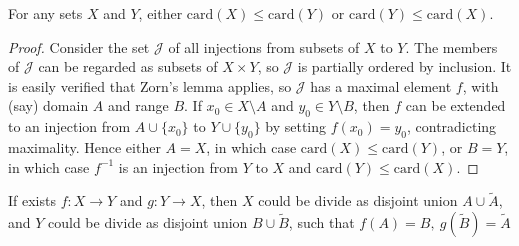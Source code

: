 \begin{prop}
For any sets $X$ and $Y$, either $\mathrm{card}(X) \leq \mathrm{card}(Y)$ or 
$\mathrm{card}(Y) \leq \mathrm{card}(X)$.
\end{prop}

\begin{proof}
Consider the set $\mathcal{J}$ of all injections from subsets of $X$ to $Y$. 
The members of $\mathcal{J}$ can be regarded as subsets of $X \times Y$, so 
$\mathcal{J}$ is partially ordered by inclusion. It is easily verified that 
Zorn's lemma applies, so $\mathcal{J}$ has a maximal element $f$, with (say) 
domain $A$ and range $B$. If $x_0 \in X \setminus A$ and $y_0 \in Y \setminus B$, 
then $f$ can be extended to an injection from $A \cup \{x_0\}$ to 
$Y \cup \{y_0\}$ by setting $f(x_0) = y_0$, contradicting maximality. 
Hence either $A = X$, in which case $\mathrm{card}(X) \leq \mathrm{card}(Y)$, 
or $B = Y$, in which case $f^{-1}$ is an injection from $Y$ to $X$ and 
$\mathrm{card}(Y) \leq \mathrm{card}(X)$.
\end{proof}

\begin{thm}\label{5dd1cdb2}
    If exists $f: X \to Y$ and $g: Y \to X$, then $X$ could be divide as disjoint union $A \cup \tilde{A}$, and 
    $Y$ could be divide as disjoint union $B \cup \tilde{B}$, such that $f(A) = B,\: g(\tilde{B}) = \tilde{A}$
\end{thm}

